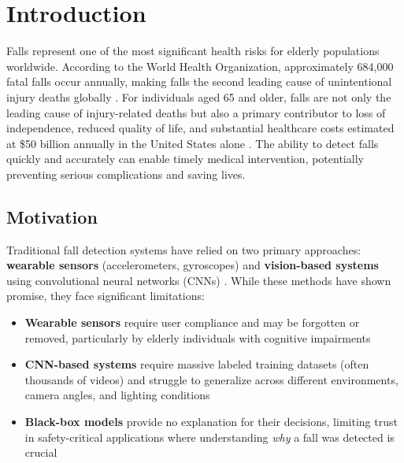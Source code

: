 \documentclass[conference]{IEEEtran}
\begin{document}
\section{Introduction}

Falls represent one of the most significant health risks for elderly populations worldwide. According to the World Health Organization, approximately 684,000 fatal falls occur annually, making falls the second leading cause of unintentional injury deaths globally \cite{who2021falls}. For individuals aged 65 and older, falls are not only the leading cause of injury-related deaths but also a primary contributor to loss of independence, reduced quality of life, and substantial healthcare costs estimated at \$50 billion annually in the United States alone \cite{cdc2020falls}. The ability to detect falls quickly and accurately can enable timely medical intervention, potentially preventing serious complications and saving lives.

\subsection{Motivation}

Traditional fall detection systems have relied on two primary approaches: \textbf{wearable sensors} (accelerometers, gyroscopes) and \textbf{vision-based systems} using convolutional neural networks (CNNs) \cite{noury2007fall, mubashir2013survey}. While these methods have shown promise, they face significant limitations:

\begin{itemize}[leftmargin=*]
    \item \textbf{Wearable sensors} require user compliance and may be forgotten or removed, particularly by elderly individuals with cognitive impairments
    \item \textbf{CNN-based systems} require massive labeled training datasets (often thousands of videos) and struggle to generalize across different environments, camera angles, and lighting conditions
    \item \textbf{Black-box models} provide no explanation for their decisions, limiting trust in safety-critical applications where understanding \textit{why} a fall was detected is crucial
\end{itemize}
\end{document}
